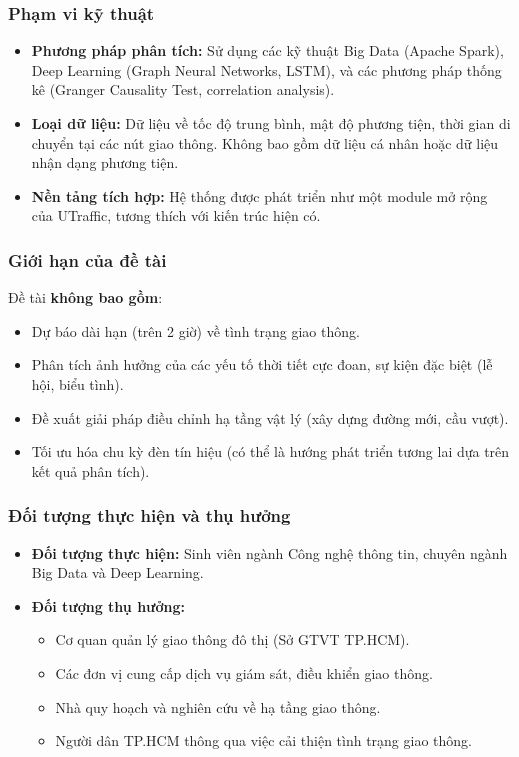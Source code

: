 \subsubsection{Phạm vi kỹ thuật}
\begin{itemize}
    \item \textbf{Phương pháp phân tích:} Sử dụng các kỹ thuật Big Data (Apache Spark), Deep Learning (Graph Neural Networks, LSTM), và các phương pháp thống kê (Granger Causality Test, correlation analysis).
    
    \item \textbf{Loại dữ liệu:} Dữ liệu về tốc độ trung bình, mật độ phương tiện, thời gian di chuyển tại các nút giao thông. Không bao gồm dữ liệu cá nhân hoặc dữ liệu nhận dạng phương tiện.
    
    \item \textbf{Nền tảng tích hợp:} Hệ thống được phát triển như một module mở rộng của UTraffic, tương thích với kiến trúc hiện có.
\end{itemize}

\subsubsection{Giới hạn của đề tài}
Đề tài \textbf{không bao gồm}:
\begin{itemize}
    \item Dự báo dài hạn (trên 2 giờ) về tình trạng giao thông.
    \item Phân tích ảnh hưởng của các yếu tố thời tiết cực đoan, sự kiện đặc biệt (lễ hội, biểu tình).
    \item Đề xuất giải pháp điều chỉnh hạ tầng vật lý (xây dựng đường mới, cầu vượt).
    \item Tối ưu hóa chu kỳ đèn tín hiệu (có thể là hướng phát triển tương lai dựa trên kết quả phân tích).
\end{itemize}

\subsubsection{Đối tượng thực hiện và thụ hưởng}
\begin{itemize}
    \item \textbf{Đối tượng thực hiện:} Sinh viên ngành Công nghệ thông tin, chuyên ngành Big Data và Deep Learning.
    
    \item \textbf{Đối tượng thụ hưởng:} 
    \begin{itemize}
        \item Cơ quan quản lý giao thông đô thị (Sở GTVT TP.HCM).
        \item Các đơn vị cung cấp dịch vụ giám sát, điều khiển giao thông.
        \item Nhà quy hoạch và nghiên cứu về hạ tầng giao thông.
        \item Người dân TP.HCM thông qua việc cải thiện tình trạng giao thông.
    \end{itemize}
\end{itemize}

